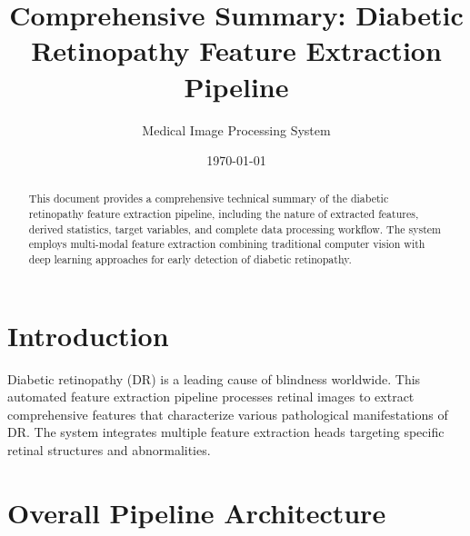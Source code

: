 \documentclass[11pt]{article}
\title{Comprehensive Summary: Diabetic Retinopathy Feature Extraction Pipeline}
\author{Medical Image Processing System}
\date{\today}
\begin{document}
\maketitle

\begin{abstract}
This document provides a comprehensive technical summary of the diabetic retinopathy feature extraction pipeline, including the nature of extracted features, derived statistics, target variables, and complete data processing workflow. The system employs multi-modal feature extraction combining traditional computer vision with deep learning approaches for early detection of diabetic retinopathy.
\end{abstract}

\tableofcontents

\section{Introduction}

Diabetic retinopathy (DR) is a leading cause of blindness worldwide. This automated feature extraction pipeline processes retinal images to extract comprehensive features that characterize various pathological manifestations of DR. The system integrates multiple feature extraction heads targeting specific retinal structures and abnormalities.

\section{Overall Pipeline Architecture}
\end{document}
